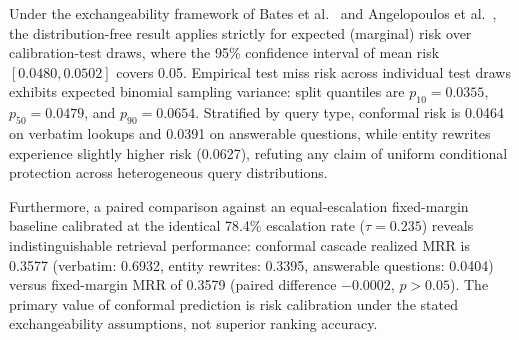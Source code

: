 \documentclass[conference]{IEEEtran}
\begin{document}
Under the exchangeability framework of Bates et al.~\cite{bates2021conformal} and Angelopoulos et al.~\cite{angelopoulos2021gentle}, the distribution-free result applies strictly for expected (marginal) risk over calibration-test draws, where the 95\% confidence interval of mean risk $[0.0480, 0.0502]$ covers 0.05. Empirical test miss risk across individual test draws exhibits expected binomial sampling variance: split quantiles are $p_{10} = 0.0355$, $p_{50} = 0.0479$, and $p_{90} = 0.0654$. Stratified by query type, conformal risk is 0.0464 on verbatim lookups and 0.0391 on answerable questions, while entity rewrites experience slightly higher risk (0.0627), refuting any claim of uniform conditional protection across heterogeneous query distributions.

Furthermore, a paired comparison against an equal-escalation fixed-margin baseline calibrated at the identical 78.4\% escalation rate ($\tau = 0.235$) reveals indistinguishable retrieval performance: conformal cascade realized MRR is 0.3577 (verbatim: 0.6932, entity rewrites: 0.3395, answerable questions: 0.0404) versus fixed-margin MRR of 0.3579 (paired difference $-0.0002$, $p > 0.05$). The primary value of conformal prediction is risk calibration under the stated exchangeability assumptions, not superior ranking accuracy.

\begin{table}[t]
\centering\small
\caption{Conformal Cascade Calibration: Corrected Marginal Loss, High-Probability RCPS ($\delta=0.10$), and Equal-Escalation Baseline over 200 Cluster-Aware Splits ($N=2{,}754$ instances, nominal target $\epsilon=0.05$).}\label{tab:conformal_cascade_v6}
\end{table}
\end{document}
